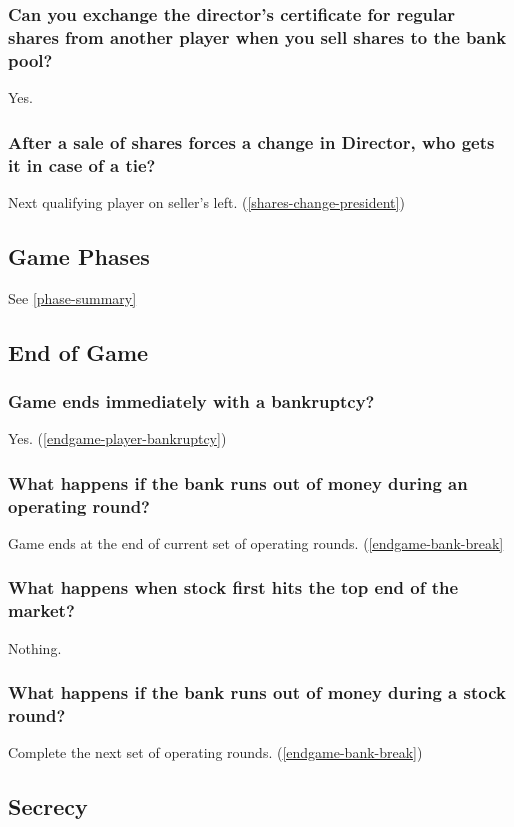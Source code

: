 \subsubsection{Can you exchange the director's certificate for regular
  shares from another player when you sell shares to the bank pool?}
Yes.

\subsubsection{After a sale of shares forces a change in Director, who
  gets it in case of a tie?}
Next qualifying player on seller's left. (\autoref{shares-change-president})

\subsection{Game Phases}
See \autoref{phase-summary}

\subsection{End of Game}

\subsubsection{Game ends immediately with a bankruptcy?}
Yes. (\autoref{endgame-player-bankruptcy})

\subsubsection{What happens if the bank runs out of money during an
  operating round?}
Game ends at the end of current set of operating
rounds. (\autoref{endgame-bank-break}

\subsubsection{What happens when stock first hits the top end of the market?}
Nothing.

\subsubsection{What happens if the bank runs out of money during a stock
  round?}
Complete the next set of operating rounds. (\autoref{endgame-bank-break})

\subsection{Secrecy}

